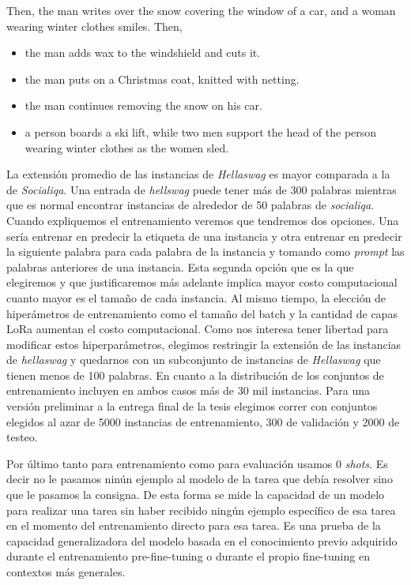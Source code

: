 \documentclass[11pt,a4paper,twoside]{tesis}
\begin{document}
\begin{center}
\begin{mdframed}
\small %
Then, the man writes over the snow covering the window of a car, and a woman wearing winter clothes smiles. Then,
\begin{itemize}
    \item the man adds wax to the windshield and cuts it.
    \item the man puts on a Christmas coat, knitted with netting.
    \item the man continues removing the snow on his car.
    \item a person boards a ski lift, while two men support the head of the person wearing winter clothes as the women sled.
\end{itemize}
\end{mdframed}
\end{center}
La extensión promedio de las instancias de \textit{Hellaswag} es mayor comparada a la de \textit{Socialiqa}. Una entrada de \textit{hellswag} puede tener más de 300 palabras mientras que es normal encontrar instancias de alrededor de 50 palabras de \textit{socialiqa}. Cuando expliquemos el entrenamiento veremos que tendremos dos opciones. Una sería entrenar en predecir la etiqueta de una instancia y otra entrenar en predecir la siguiente palabra para cada palabra de la instancia y tomando como \textit{prompt} las palabras anteriores de una instancia. Esta segunda opción que es la que elegiremos y que justificaremos más adelante implica mayor costo computacional cuanto mayor es el tamaño de cada instancia. Al mismo tiempo, la elección de hiperámetros de entrenamiento como el tamaño del batch y la cantidad de capas LoRa aumentan el costo computacional. Como nos interesa tener libertad para modificar estos hiperparámetros, elegimos restringir la extensión de las instancias de \textit{hellaswag} y quedarnos con un subconjunto de instancias de \textit{Hellaswag} que tienen menos de 100 palabras. 
En cuanto a la distribución de los conjuntos de entrenamiento incluyen en ambos casos más de 30 mil instancias. Para una versión preliminar a la entrega final de la tesis elegimos correr con conjuntos elegidos al azar de 5000 instancias de entrenamiento, 300 de validación y 2000 de testeo.

Por último tanto para entrenamiento como para evaluación usamos 0 \textit{shots}. Es decir no le pasamos ninún ejemplo al modelo de la tarea que debía resolver sino que le pasamos la consigna. De esta forma se mide la capacidad de un modelo para realizar una tarea sin haber recibido ningún ejemplo específico de esa tarea en el momento del entrenamiento directo para esa tarea. Es una prueba de la capacidad generalizadora del modelo basada en el conocimiento previo adquirido durante el entrenamiento pre-fine-tuning o durante el propio fine-tuning en contextos más generales.
\end{document}
